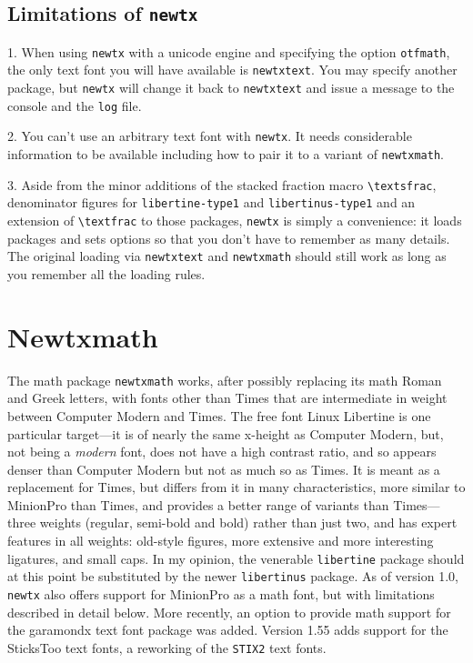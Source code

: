\documentclass[\fsc]{article}
\theoremstyle{oldplain}
\theoremstyle{plain}
\begin{document}
\subsection{Limitations of {\tt newtx}}

1. When using {\tt newtx} with a unicode engine and specifying the option {\tt otfmath}, the only text font you will have available is {\tt newtxtext}. You may specify another package, but {\tt newtx} will change it back to {\tt newtxtext} and issue a message to the console and the {\tt log} file.

2. You can't use an arbitrary text font with {\tt newtx}. It needs considerable information to be available including how to pair it to a variant of {\tt newtxmath}.

3. Aside from the minor additions of the stacked fraction macro \verb|\textsfrac|, denominator figures for {\tt libertine-type1} and {\tt libertinus-type1} and an extension of \verb|\textfrac| to those packages, {\tt newtx} is simply a convenience: it loads packages and sets options so that you don't have to remember as many details.
The original loading via {\tt newtxtext} and {\tt newtxmath} should still work as long as you remember all the loading rules.

\section{Newtxmath}
The math package {\tt newtxmath} works, after possibly replacing its math Roman and Greek letters, with fonts other than Times that are intermediate in weight between Computer Modern and Times. The free font Linux Libertine is one particular target---it is of nearly the same x-height as Computer Modern, but, not being a \emph{modern} font, does not have a high contrast ratio, and so appears  denser than Computer Modern but not as much so as Times. It is meant as a replacement for Times, but  differs from it in many characteristics, more similar to MinionPro than Times, and provides a better range of variants than Times---three weights (regular, semi-bold and bold) rather than just two, and has expert features in all weights: old-style figures, more extensive and more interesting ligatures,  and  small caps. In my opinion, the venerable {\tt libertine} package should at this point be substituted by the newer {\tt libertinus} package. As of version 1.0, {\tt newtx} also offers support for MinionPro as a math font, but with limitations described in detail below. More recently, an option to provide math support for the \textsf{garamondx} text font package was added. Version 1.55 adds support for the {SticksToo} text fonts, a reworking of the {\tt STIX2} text fonts.
\end{document}
